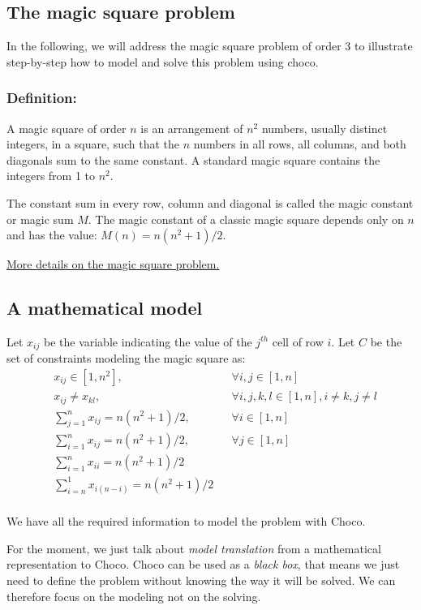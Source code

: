 \subsection{The magic square problem}\label{introduction:amagicsquareproblem}\hypertarget{introduction:amagicsquareproblem}{}
In the following, we will address the magic square problem of order 3 to illustrate step-by-step how to model and solve this problem using choco. 

\subsubsection{Definition:}
A magic square of order $n$ is an arrangement of $n^{2}$ numbers, usually distinct integers, in a square, such that the $n$ numbers in all rows, all columns, and both diagonals sum to the same constant. A standard magic square contains the integers from 1 to $n^{2}$.

The constant sum in every row, column and diagonal is called the magic constant or magic sum $M$. The magic constant of a classic magic square depends only on $n$ and has the value:
$M(n)=n(n^2 +1)/2$.

\href{http://en.wikipedia.org/wiki/Magic_square}{More details on the magic square problem.}


\subsection{A mathematical model}\label{introduction:mathematicalmodeling}\hypertarget{introduction:mathematicalmodeling}{}

Let $x_{ij}$ be the variable indicating the value of the $j^{th}$ cell of row $i$. 
Let $C$ be the set of constraints modeling the magic square as:
\begin{align*}
&x_{ij} \in [1,n^2],\ &&\forall i,j \in [1, n]\\
&x_{ij}\ne x_{kl},\ &&\forall i,j,k,l \in [1,n], i\ne k, j\ne l\\
&\sum_{j=1}^{n} x_{ij} = n(n^2 +1)/2,\ &&\forall i \in [1,n]\\
&\sum_{i=1}^{n} x_{ij} = n(n^2 +1)/2,\ &&\forall j \in [1,n]\\
&\sum_{i=1}^{n} x_{ii} = n(n^2 +1)/2&&\\
&\sum_{i=n}^{1} x_{i(n-i)} = n(n^2 +1)/2&&\\
\end{align*}

We have all the required information to model the problem with Choco.
\begin{note}
	For the moment, we just talk about \emph{model translation} from a mathematical representation to Choco.
	Choco can be used as a \emph{black box}, that means we just need to define the problem without knowing the way it will be solved. We can therefore focus on the modeling not on the solving.
\end{note}

